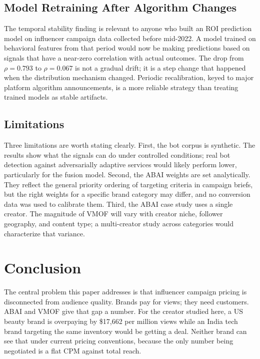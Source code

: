 \documentclass[conference]{IEEEtran}
\begin{document}
\subsection{Model Retraining After Algorithm Changes}

The temporal stability finding is relevant to anyone who built an ROI
prediction model on influencer campaign data collected before mid-2022.
A model trained on behavioral features from that period would now be
making predictions based on signals that have a near-zero correlation with
actual outcomes. The drop from $\rho=0.793$ to $\rho=0.067$ is not a
gradual drift; it is a step change that happened when the distribution
mechanism changed. Periodic recalibration, keyed to major platform
algorithm announcements, is a more reliable strategy than treating trained
models as stable artifacts.

\subsection{Limitations}

Three limitations are worth stating clearly. First, the bot corpus is
synthetic. The results show what the signals can do under controlled
conditions; real bot detection against adversarially adaptive services
would likely perform lower, particularly for the fusion model. Second,
the ABAI weights are set analytically. They reflect the general priority
ordering of targeting criteria in campaign briefs, but the right weights
for a specific brand category may differ, and no conversion data was
used to calibrate them. Third, the ABAI case study uses a single creator.
The magnitude of VMOF will vary with creator niche, follower geography,
and content type; a multi-creator study across categories would
characterize that variance.

\section{Conclusion}

The central problem this paper addresses is that influencer campaign pricing
is disconnected from audience quality. Brands pay for views; they need
customers. ABAI and VMOF give that gap a number. For the creator studied
here, a US beauty brand is overpaying by \$17,662 per million views while
an India tech brand targeting the same inventory would be getting a deal.
Neither brand can see that under current pricing conventions, because the
only number being negotiated is a flat CPM against total reach.
\end{document}
